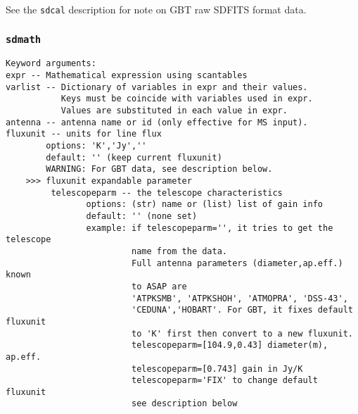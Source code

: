 
See the {\tt sdcal} description for note on GBT raw SDFITS format data.

\subsubsection{{\tt sdmath}}
\label{section:sd.sdtasks.tasks.sdmath}

\begin{verbatim}
Keyword arguments:
expr -- Mathematical expression using scantables 
varlist -- Dictionary of variables in expr and their values.
           Keys must be coincide with variables used in expr.
           Values are substituted in each value in expr.
antenna -- antenna name or id (only effective for MS input). 
fluxunit -- units for line flux
        options: 'K','Jy',''
        default: '' (keep current fluxunit)
        WARNING: For GBT data, see description below.
    >>> fluxunit expandable parameter
         telescopeparm -- the telescope characteristics
                options: (str) name or (list) list of gain info
                default: '' (none set)
                example: if telescopeparm='', it tries to get the telescope
                         name from the data.
                         Full antenna parameters (diameter,ap.eff.) known
                         to ASAP are
                         'ATPKSMB', 'ATPKSHOH', 'ATMOPRA', 'DSS-43',
                         'CEDUNA','HOBART'. For GBT, it fixes default fluxunit
                         to 'K' first then convert to a new fluxunit.
                         telescopeparm=[104.9,0.43] diameter(m), ap.eff.
                         telescopeparm=[0.743] gain in Jy/K
                         telescopeparm='FIX' to change default fluxunit
                         see description below


\end{verbatim}
